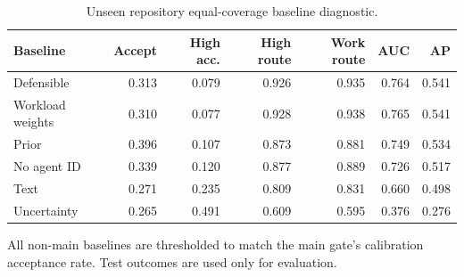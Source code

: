 \begin{table}[t]
\centering
\scriptsize
\caption{Unseen repository equal-coverage baseline diagnostic.}
\label{tab:aidev-equal-coverage}
\setlength{\tabcolsep}{2pt}
\begin{tabular}{lrrrrrr}
\toprule
Baseline & Accept & High acc. & High route & Work route & AUC & AP \\
\midrule
Defensible & 0.313 & 0.079 & 0.926 & 0.935 & 0.764 & 0.541 \\
Workload weights & 0.310 & 0.077 & 0.928 & 0.938 & 0.765 & 0.541 \\
Prior & 0.396 & 0.107 & 0.873 & 0.881 & 0.749 & 0.534 \\
No agent ID & 0.339 & 0.120 & 0.877 & 0.889 & 0.726 & 0.517 \\
Text & 0.271 & 0.235 & 0.809 & 0.831 & 0.660 & 0.498 \\
Uncertainty & 0.265 & 0.491 & 0.609 & 0.595 & 0.376 & 0.276 \\
\bottomrule
\end{tabular}
\par\footnotesize{All non-main baselines are thresholded to match the main gate's calibration acceptance rate. Test outcomes are used only for evaluation.}
\end{table}
